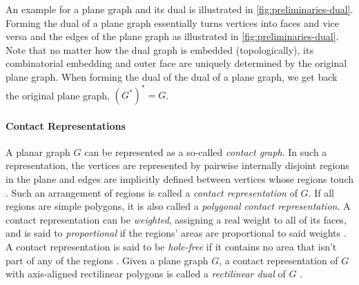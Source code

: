 An example for a plane graph and its dual is illustrated in \cref{fig:preliminaries-dual}.
Forming the dual of a plane graph essentially turns vertices into faces and vice versa and  the edges of the plane graph as illustrated in \cref{fig:preliminaries-dual}.
Note that no matter how the dual graph is embedded (topologically), its combinatorial embedding and outer face are uniquely determined by the original plane graph.
When forming the dual of the dual of a plane graph, we get back the original plane graph, \ie{} $(G^*)^* = G$.




\paragraph{Contact Representations}

\begin{definition}
A planar graph $G$ can be represented as a so-called \emph{contact graph}.
In such a representation, the vertices are represented by pairwise internally disjoint regions in the plane and edges are implicitly defined between vertices whose regions touch \cite{alam2013linear}.
Such an arrangement of regions is called a \emph{contact representation} of $G$.
If all regions are simple polygons, it is also called a \emph{polygonal contact representation}.
A contact representation can be \emph{weighted}, assigning a real weight to all of its faces, and is said to \emph{proportional} if the regions' areas are proportional to said weights \cite{alam2013linear}.
A contact representation is said to be \emph{hole-free} if it contains no area that isn't part of any of the regions \cite{alam2013linear}.
Given a plane graph $G$, a contact representation of $G$ with axis-aligned rectilinear polygons is called a \emph{rectilinear dual} of $G$ \cite{alam2013computing}.
\end{definition}

